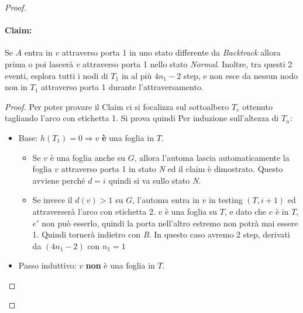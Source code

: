 \begin{proof}
    \paragraph{Claim:} Se $A$ entra in $v$ attraverso porta 1 in uno stato
    differente da \textit{Backtrack} allora prima o poi lascerà $v$ attraverso
    porta 1 nello stato \textit{Normal}. Inoltre, tra questi 2 eventi, esplora
    tutti i nodi di $T_1$ in al più $4n_1 - 2$ step, e non esce da nessun nodo
    non in $T_1$ attraverso porta 1 durante l'attraversamento.
    \begin{proof}
        Per poter provare il Claim ci si focalizza sul sottoalbero $T_v$ ottenuto
        tagliando l'arco con etichetta 1. Si prova quindi Per induzione sull'altezza
        di $T_n$:
        \begin{itemize}
            \item Base: $h(T_1) = 0 \Rightarrow v$ \textbf{è} una foglia in $T$.
                  \begin{itemize}
                      \item Se $v$ è una foglia anche su $G$, allora l'automa lascia
                            automaticamente la foglia $v$ attraverso porta 1 in
                            stato \textit{N} ed il claim è dimostrato. Questo avviene
                            perché $d=i$ quindi si va sullo stato \textit{N}.
                      \item Se invece il $d(v)>1$ su $G$, l'automa entra in $v$ in
                            testing $(T, i+1)$ ed attraverserà l'arco con
                            etichetta 2. $v$ è una foglia su $T$, e dato che $e$ è
                            in $T$, $e'$ non può esserlo, quindi la porta
                            nell'altro estremo non potrà mai essere 1. Quindi
                            tornerà indietro con \textit{B}. In questo caso avremo 2
                            step, derivati da $(4n_1 -2)$ con $n_1=1$
                  \end{itemize}
            \item Passo induttivo: $v$ \textbf{non} è una foglia in $T$.
\end{itemize}
\end{proof}
\end{proof}

